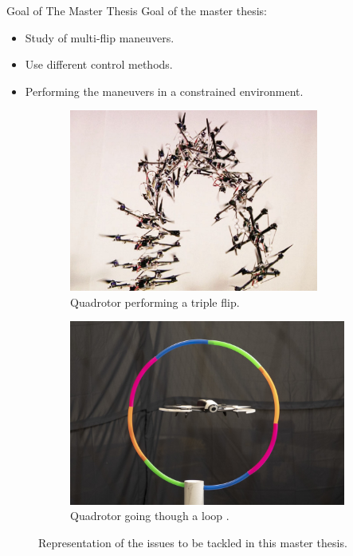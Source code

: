 \documentclass{thesisbeamer}
\begin{document}
\begin{frame}[t]{Goal of The Master Thesis} \vspace{4pt}
Goal of the master thesis: 

\begin{itemize}[<+->]
	\item Study of multi-flip maneuvers.
	\item Use different control methods.
	\item Performing the maneuvers in a constrained environment.
\end{itemize}

\begin{figure}[h]
     \centering
     \begin{subfigure}[h]{0.45\textwidth}
         \centering
         \includegraphics[width=0.9\textwidth]{Images/Introduction/flip}
    \caption{Quadrotor performing a triple flip.\cite{flip}}
         \label{triple_flip}
     \end{subfigure}
     \hfill
     \begin{subfigure}[h]{0.45\textwidth}
         \centering
         \includegraphics[width=\textwidth]{Images/Introduction/constrained_environment}
         \caption[Caption for LOF]{Quadrotor going though a loop \cite{Coxworth2020}.}
         \label{drone_hulahoop}
     \end{subfigure}
        \caption{Representation of the issues to be tackled in this master thesis.}
        \label{fig:three graphs}
\end{figure}

\end{frame}
\end{document}
